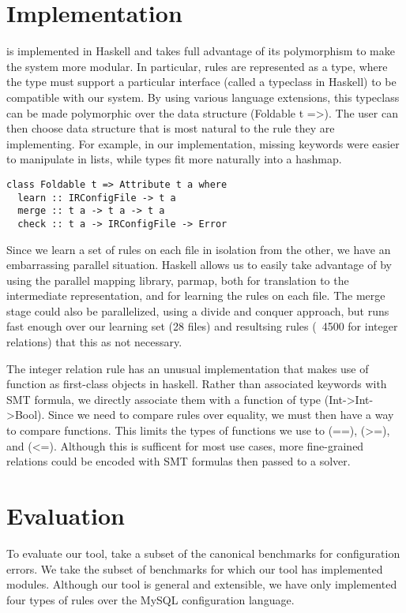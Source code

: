\section{Implementation}

\app is implemented in Haskell and takes full advantage of its polymorphism to make the system more modular.
In particular, rules are represented as a type, where the type must support a particular interface (called a typeclass in Haskell) to be compatible with our system.
By using various language extensions, this typeclass can be made polymorphic over the data structure (Foldable t =>).
The user can then choose data structure that is most natural to the rule they are implementing.
For example, in our implementation, missing keywords were easier to manipulate in lists, while types fit more naturally into a hashmap.

\begin{lstlisting}
class Foldable t => Attribute t a where
  learn :: IRConfigFile -> t a
  merge :: t a -> t a -> t a
  check :: t a -> IRConfigFile -> Error
\end{lstlisting}

Since we learn a set of rules on each file in isolation from the other, we have an embarrassing parallel situation.
Haskell allows us to easily take advantage of by using the parallel mapping library, parmap, both for translation to the intermediate representation, and for learning the rules on each file.
The merge stage could also be parallelized, using a divide and conquer approach, but \app runs fast enough over our learning set (28 files) and resultsing rules (~4500 for integer relations) that this as not necessary.

The integer relation rule has an unusual implementation that makes use of function as first-class objects in haskell.
Rather than associated keywords with SMT formula, we directly associate them with a function of type (Int->Int->Bool).
Since we need to compare rules over equality, we must then have a way to compare functions.
This limits the types of functions we use to (==), (>=), and (<=).
Although this is sufficent for most use cases, more fine-grained relations could be encoded with SMT formulas then passed to a solver.


\section{Evaluation}

To evaluate our tool, take a subset of the canonical benchmarks for configuration errors\cite{dataset}.
We take the subset of benchmarks for which our tool has implemented modules.
Although our tool is general and extensible, we have only implemented four types of rules over the MySQL configuration language.

